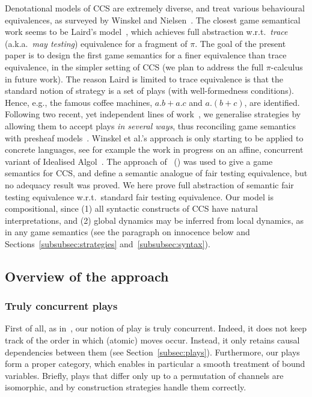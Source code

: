 \documentclass{LMCS}
\theoremstyle{plain}\newtheorem{satz}[thm]{Satz}
\begin{document}
Denotational models of CCS are extremely diverse, and treat various
behavioural equivalences, as surveyed by Winskel and
Nielsen~\cite{WN}. The closest game semantical work seems to be
Laird's model~\cite{DBLP:conf/fsttcs/Laird06}, which achieves full
abstraction w.r.t.\ \emph{trace} (a.k.a.\ \emph{may testing})
equivalence for a fragment of $\pi$.  The goal of the present paper is
to design the first game semantics for a finer equivalence than trace
equivalence, in the simpler setting of CCS (we plan to address the
full $\pi$-calculus in future work).  The reason Laird is limited to
trace equivalence is that the standard notion of strategy is a set of
plays (with well-formedness conditions). Hence, e.g., the famous
coffee machines, $a.b + a.c$ and $a.(b+c)$, are identified.  Following
two recent, yet independent lines of work~\cite{RideauW,HP11}, we
generalise strategies by allowing them to accept plays \emph{in
  several ways}, thus reconciling game semantics with presheaf
models~\cite{DBLP:conf/lics/JoyalNW93}. Winskel et al.'s approach is
only starting to be applied to concrete languages, see for example the
work in progress on an affine, concurrent variant of Idealised
Algol~\cite{CCWGalop14}.  The approach
of~\cite{HP11,2011arXiv1109.4356H} ()
was used to give a game semantics for CCS, and define a semantic
analogue of fair testing equivalence, but no adequacy result was
proved. We here prove full abstraction of semantic fair testing
equivalence w.r.t.\ standard fair testing equivalence.  Our model is
compositional, since (1) all syntactic constructs of CCS have natural
interpretations, and (2) global dynamics may be inferred from local
dynamics, as in any game semantics (see the paragraph on innocence
below and Sections~\ref{subsubsec:strategies}
and~\ref{subsubsec:syntax}).

\subsection{Overview of the approach}
\subsubsection*{Truly concurrent plays}
First of all, as in~\cite{RideauW}, our notion of play is truly
concurrent.  Indeed, it does not keep track of the order in which
(atomic) moves occur.  Instead, it only retains causal dependencies
between them (see Section~\ref{subsec:plays}).  Furthermore, our plays
form a proper category, which enables in particular a smooth treatment
of bound variables. Briefly, plays that differ only up to a
permutation of channels are isomorphic, and by construction strategies
handle them correctly.
\end{document}
